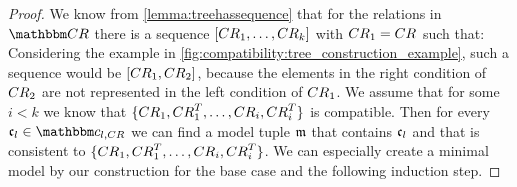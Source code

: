 \begin{proof}
    We know from \autoref{lemma:treehassequence} that for the relations in $\consistencyrelationset{CR}$ there is a sequence $\sequenced{\consistencyrelation{CR}{1}, \dots, \consistencyrelation{CR}{k}}$ with $\consistencyrelation{CR}{1} = \consistencyrelation{CR}{}$ such that:
    Considering the example in \autoref{fig:compatibility:tree_construction_example}, such a sequence would be $\sequenced{\consistencyrelation{CR}{1}, \consistencyrelation{CR}{2}}$, because the elements in the right condition of $\consistencyrelation{CR}{2}$ are not represented in the left condition of $\consistencyrelation{CR}{1}$.
    We assume that for some $i < k$ we know that $\setted{\consistencyrelation{CR}{1}, \consistencyrelation{CR}{1}^T, \dots, \consistencyrelation{CR}{i}, \consistencyrelation{CR}{i}^T}$ is compatible.
    Then for every $\conditionelement{c}{l} \in \condition{C}{l,\consistencyrelation{CR}{}}$ we can find a model tuple $\modeltuple{m}$ that contains $\conditionelement{c}{l}$ and that is consistent to $\setted{\consistencyrelation{CR}{1}, \consistencyrelation{CR}{1}^T, \dots, \consistencyrelation{CR}{i}, \consistencyrelation{CR}{i}^T}$.
    We can especially create a minimal model by our construction for the base case and the following induction step.
    

\end{proof}
